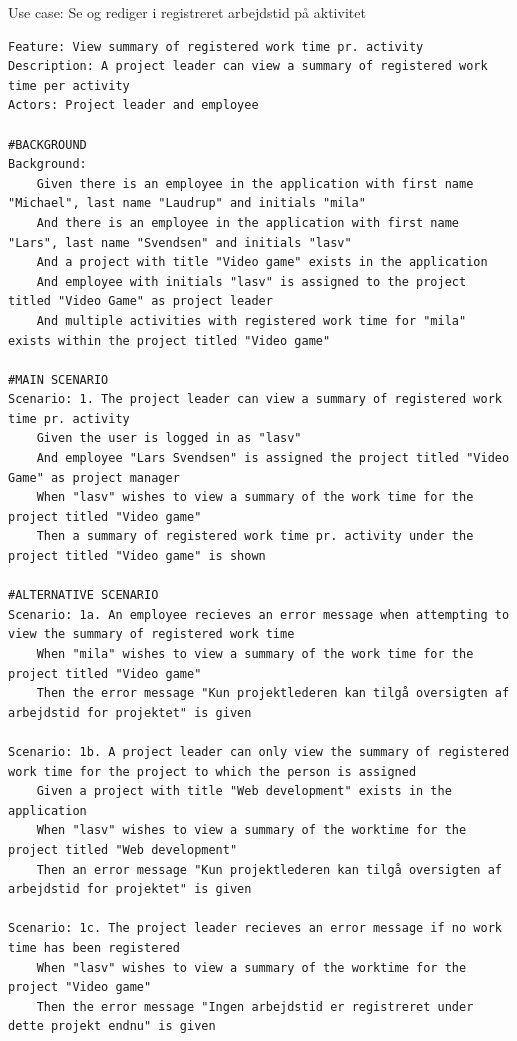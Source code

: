 \begin{listing}
    \centering
    \caption{Use case: Se og rediger i registreret arbejdstid på aktivitet}\label{lst:usecase_oversigt_over_registreret_arbejdstid_pr_aktivitet}
    \begin{verbatim}  
Feature: View summary of registered work time pr. activity
Description: A project leader can view a summary of registered work time per activity
Actors: Project leader and employee

#BACKGROUND
Background: 
    Given there is an employee in the application with first name "Michael", last name "Laudrup" and initials "mila"
    And there is an employee in the application with first name "Lars", last name "Svendsen" and initials "lasv"
    And a project with title "Video game" exists in the application
    And employee with initials "lasv" is assigned to the project titled "Video Game" as project leader
    And multiple activities with registered work time for "mila" exists within the project titled "Video game"

#MAIN SCENARIO
Scenario: 1. The project leader can view a summary of registered work time pr. activity
    Given the user is logged in as "lasv"
    And employee "Lars Svendsen" is assigned the project titled "Video Game" as project manager
    When "lasv" wishes to view a summary of the work time for the project titled "Video game"
    Then a summary of registered work time pr. activity under the project titled "Video game" is shown

#ALTERNATIVE SCENARIO
Scenario: 1a. An employee recieves an error message when attempting to view the summary of registered work time
    When "mila" wishes to view a summary of the work time for the project titled "Video game"
    Then the error message "Kun projektlederen kan tilgå oversigten af arbejdstid for projektet" is given

Scenario: 1b. A project leader can only view the summary of registered work time for the project to which the person is assigned
    Given a project with title "Web development" exists in the application
    When "lasv" wishes to view a summary of the worktime for the project titled "Web development"
    Then an error message "Kun projektlederen kan tilgå oversigten af arbejdstid for projektet" is given

Scenario: 1c. The project leader recieves an error message if no work time has been registered
    When "lasv" wishes to view a summary of the worktime for the project "Video game"
    Then the error message "Ingen arbejdstid er registreret under dette projekt endnu" is given
    \end{verbatim}
\end{listing}
